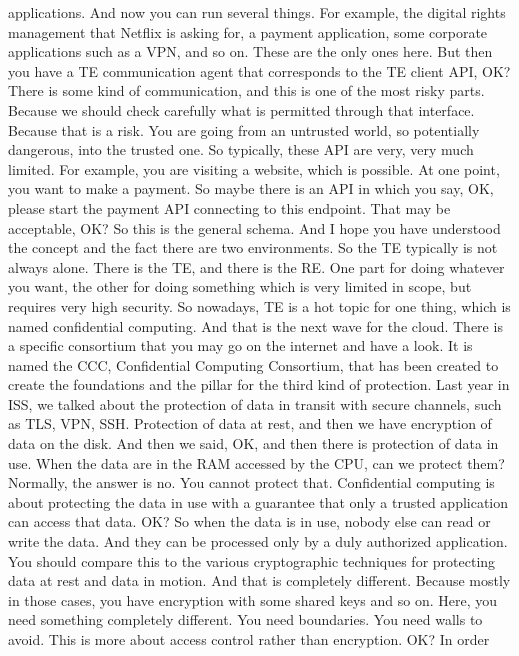 applications. And now you can run several things. For example, the digital
 rights management that Netflix is asking for, a payment application, some
 corporate applications such as a VPN, and so on. These are the only ones here.
 But then you have a TE communication agent that corresponds to the TE client
 API, OK? There is some kind of communication, and this is one of the most
 risky parts. Because we should check carefully what is permitted through that
 interface. Because that is a risk. You are going from an untrusted world, so
 potentially dangerous, into the trusted one. So typically, these API are very,
 very much limited. For example, you are visiting a website, which is possible.
 At one point, you want to make a payment. So maybe there is an API in which
 you say, OK, please start the payment API connecting to this endpoint. That
 may be acceptable, OK? So this is the general schema. And I hope you have
 understood the concept and the fact there are two environments. So the TE
 typically is not always alone. There is the TE, and there is the RE. One part
 for doing whatever you want, the other for doing something which is very
 limited in scope, but requires very high security. So nowadays, TE is a hot
 topic for one thing, which is named confidential computing. And that is the
 next wave for the cloud. There is a specific consortium that you may go on the
 internet and have a look. It is named the CCC, Confidential Computing
 Consortium, that has been created to create the foundations and the pillar for
 the third kind of protection. Last year in ISS, we talked about the protection
 of data in transit with secure channels, such as TLS, VPN, SSH. Protection of
 data at rest, and then we have encryption of data on the disk. And then we
 said, OK, and then there is protection of data in use. When the data are in
 the RAM accessed by the CPU, can we protect them? Normally, the answer is no.
 You cannot protect that. Confidential computing is about protecting the data
 in use with a guarantee that only a trusted application can access that data.
 OK? So when the data is in use, nobody else can read or write the data. And
 they can be processed only by a duly authorized application. You should
 compare this to the various cryptographic techniques for protecting data at
 rest and data in motion. And that is completely different. Because mostly in
 those cases, you have encryption with some shared keys and so on. Here, you
 need something completely different. You need boundaries. You need walls to
 avoid. This is more about access control rather than encryption. OK? In order
